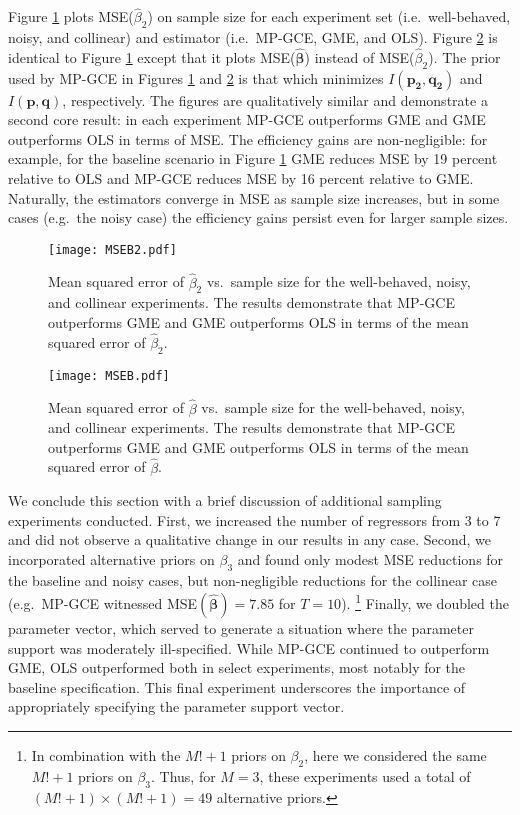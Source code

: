 \documentclass{elsarticle}
\begin{document}
Figure \ref{fig: MSEB1} plots MSE($\hat{\beta}_2$) on sample size for each 
experiment set (i.e.\ well-behaved, noisy, and collinear) and estimator (i.e.\ MP-GCE, 
GME, and OLS).
Figure \ref{fig: MSEB} is identical to Figure \ref{fig: MSEB1} except that it plots 
MSE($\mathbf{\hat{\beta}}$) instead of MSE($\hat{\beta}_2$).
The prior used by MP-GCE in Figures \ref{fig: MSEB1} and \ref{fig: MSEB} is that which 
minimizes $I(\mathbf{p_2}, \mathbf{q_2})$ and $I(\mathbf{p}, \mathbf{q})$, respectively.
The figures are qualitatively similar and demonstrate a second core result: in each 
experiment MP-GCE outperforms GME and GME outperforms OLS in terms of MSE.
The efficiency gains are non-negligible: for example, for the baseline scenario in 
Figure \ref{fig: MSEB1} GME reduces MSE by 19 percent relative to OLS 
and MP-GCE reduces MSE by 16 percent relative to GME.
Naturally, the estimators converge in MSE as sample size increases, but in some cases
(e.g.\ the noisy case) the efficiency gains persist even for larger sample sizes.

\begin{figure}[htbp]
\centering
\texttt{[image: MSEB2.pdf]}
\caption{Mean squared error of $\hat{\beta}_2$ vs.\ sample size for the well-behaved,
noisy, and collinear experiments. The results demonstrate that MP-GCE outperforms 
GME and GME outperforms OLS in terms of the mean squared error of $\hat{\beta}_2$.}
\label{fig: MSEB1}
\end{figure}

\begin{figure}[htbp]
\centering
\texttt{[image: MSEB.pdf]}
\caption{Mean squared error of $\hat{\beta}$ vs.\ sample size for the well-behaved,
noisy, and collinear experiments. The results demonstrate that MP-GCE outperforms 
GME and GME outperforms OLS in terms of the mean squared error of $\hat{\beta}$.}
\label{fig: MSEB}
\end{figure}

We conclude this section with a brief discussion of additional sampling 
experiments conducted. 
First, we increased the number of regressors from 3 to 7 and did not observe a 
qualitative change in our results in any case.
Second, we incorporated alternative priors on $\beta_3$ and found only 
modest MSE reductions for the baseline and noisy cases, but 
non-negligible reductions for the collinear case (e.g.\ MP-GCE witnessed 
MSE$(\mathbf{\hat{\beta}})=7.85$ for $T=10$).%
\footnote{In combination with the $M! + 1$ priors on $\beta_2$, here we 
considered the same $M! + 1$ priors on $\beta_3$.
Thus, for $M=3$, these experiments used a total of $(M! + 1)\times (M! + 1) 
= 49$ alternative priors.}
Finally, we doubled the parameter vector, which served to generate a situation 
where the parameter support was moderately ill-specified.
While MP-GCE continued to outperform GME, OLS outperformed both in select 
experiments, most notably for the baseline specification.
This final experiment underscores the importance of appropriately specifying
the parameter support vector.
\end{document}
